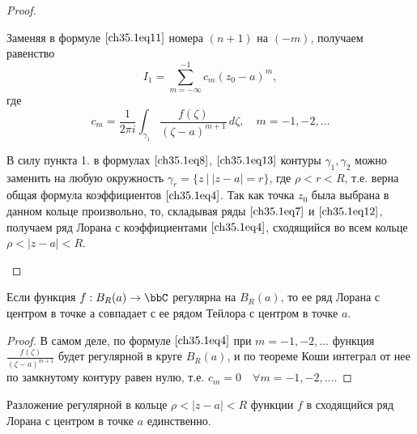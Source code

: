 \begin{proof}
\begin{enumerate}
Заменяя в формуле $\eqref{ch35.1eq11}$ номера $(n + 1)$ на $(-m)$, получаем равенство
\begin{equation} \label{ch35.1eq12}
I_1 = \sum\limits_{m = -\infty}^{-1} c_m (z_0 - a)^m,
\end{equation}
где
\begin{equation} \label{ch35.1eq13}
c_m = \frac{1}{2\pi i} \int_{\gamma_1} \frac{f(\zeta)}{(\zeta - a)^{m + 1}} \,d\zeta, \quad m = -1,-2,\ldots
\end{equation}

В силу пункта 1. в формулах $\eqref{ch35.1eq8}$, $\eqref{ch35.1eq13}$ контуры $\gamma_1, \gamma_2$ можно заменить на любую окружность $\gamma_r = \{ z \: \big| \: |z - a| = r\}$, где $\rho < r < R$, т.е.
верна общая формула коэффициентов $\eqref{ch35.1eq4}$. Так как точка $z_0$ была выбрана в данном кольце произвольно, то, складывая ряды $\eqref{ch35.1eq7}$ и $\eqref{ch35.1eq12}$, получаем ряд Лорана с коэффициентами $\eqref{ch35.1eq4}$, сходящийся во всем кольце $\rho < |z - a| < R$.	

\end{enumerate}

\end{proof}

\begin{cons} \label{ch35.1cons1}
Если функция $f : B_R(a) \to \bbC$ регулярна на $B_R(a)$, то ее ряд Лорана с центром в точке а совпадает с ее рядом Тейлора с центром в точке $a$.
\end{cons}
\begin{proof}
В самом деле, по формуле $\eqref{ch35.1eq4}$ при $m = -1,-2, \ldots$ функция $\frac{f(\zeta)}{(\zeta - a)^{m+1}}$ будет регулярной в круге $B_R(a)$, и по теореме Коши интеграл от нее по замкнутому контуру равен нулю, т.е. $c_m = 0 \quad \forall m = -1,-2, \ldots$.
\end{proof}

\begin{thm} \label{Ch35.1Thm2}
Разложение регулярной в кольце $\rho < |z - a| < R$ функции $f$ в сходящийся ряд Лорана с центром в точке $a$ единственно.
\end{thm}

